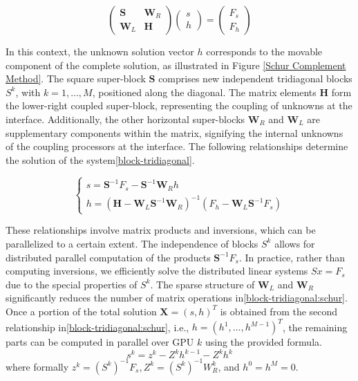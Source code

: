 \begin{equation}
\left(\begin{array}{cc}
\mathbf{S} & \mathbf{W}_R \\
\mathbf{W}_L & \mathbf{H}
\end{array}\right)\left(\begin{array}{l}
s \\
h
\end{array}\right)=\left(\begin{array}{l}
F_s \\
F_h
\end{array}\right)
\label{block-tridiagonal}
\end{equation}

In this context, the unknown solution vector $h$ corresponds to the movable component of the complete solution, as illustrated in Figure \ref{Schur Complement Method}. The square super-block $\mathbf{S}$ comprises new independent tridiagonal blocks $S^k$, with $k=1, \ldots, M$, positioned along the diagonal. The matrix elements $\mathbf{H}$ form the lower-right coupled super-block, representing the coupling of unknowns at the interface. Additionally, the other horizontal super-blocks $\mathbf{W}_R$ and $\mathbf{W}_L$ are supplementary components within the matrix, signifying the internal unknowns of the coupling processors at the interface. The following relationships determine the solution of the system\eqref{block-tridiagonal}.

\begin{equation}
\left\{\begin{array}{l}
s=\mathbf{S}^{-1} F_s-\mathbf{S}^{-1} \mathbf{W}_R h \\
h=\left(\mathbf{H}-\mathbf{W}_L \mathbf{S}^{-1} \mathbf{W}_R\right)^{-1}\left(F_h-\mathbf{W}_L \mathbf{S}^{-1} F_s\right)
\end{array}\right.
\label{block-tridiagonal:schur}
\end{equation}

These relationships involve matrix products and inversions, which can be parallelized to a certain extent. The independence of blocks $S^k$ allows for distributed parallel computation of the products $\mathbf{S}^{-1} F_s$. In practice, rather than computing inversions, we efficiently solve the distributed linear systems $Sx = F_s$ due to the special properties of $S^k$. The sparse structure of $\mathbf{W}_L$ and $\mathbf{W}_R$ significantly reduces the number of matrix operations in\eqref{block-tridiagonal:schur}. Once a portion of the total solution $\mathbf{X}=(s, h)^T$ is obtained from the second relationship in\eqref{block-tridiagonal:schur}, i.e., $h=\left(h^1, \ldots, h^{M-1}\right)^T$, the remaining parts can be computed in parallel over GPU $k$ using the provided formula.
\begin{equation}
s^k=z^k-Z^k h^{k-1}-Z^k h^k
\label{trans}
\end{equation}
where formally $z^k=\left(S^k\right)^{-1} F_s, Z^k=\left(S^k\right)^{-1} W_R^k$, and $h^0=h^M=0$.

